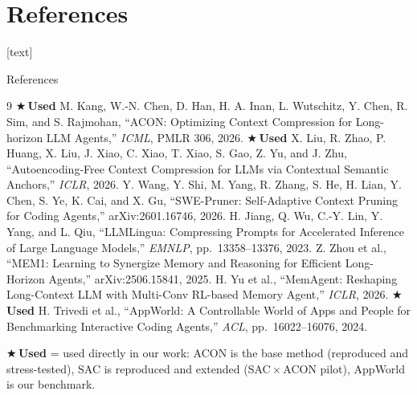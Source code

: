 \documentclass[aspectratio=169,10pt]{beamer}
\begin{document}
\section*{References}
[text]
\begin{frame}{References}
\scriptsize
\begin{thebibliography}{9}
 \textcolor{cmpgreen}{\textbf{$\bigstar$\,Used}} M. Kang, W.-N. Chen, D. Han, H. A. Inan, L. Wutschitz, Y. Chen,
R. Sim, and S. Rajmohan, ``ACON: Optimizing Context Compression for
Long-horizon LLM Agents,'' \emph{ICML}, PMLR 306, 2026.
 \textcolor{cmpgreen}{\textbf{$\bigstar$\,Used}} X. Liu, R. Zhao, P. Huang, X. Liu, J. Xiao, C. Xiao, T. Xiao,
S. Gao, Z. Yu, and J. Zhu, ``Autoencoding-Free Context Compression for LLMs via
Contextual Semantic Anchors,'' \emph{ICLR}, 2026.
 Y. Wang, Y. Shi, M. Yang, R. Zhang, S. He, H. Lian,
Y. Chen, S. Ye, K. Cai, and X. Gu, ``SWE-Pruner: Self-Adaptive Context Pruning
for Coding Agents,'' arXiv:2601.16746, 2026.
 H. Jiang, Q. Wu, C.-Y. Lin, Y. Yang, and L. Qiu,
``LLMLingua: Compressing Prompts for Accelerated Inference of Large Language
Models,'' \emph{EMNLP}, pp.~13358--13376, 2023.
 Z. Zhou et al., ``MEM1: Learning to Synergize Memory and
Reasoning for Efficient Long-Horizon Agents,'' arXiv:2506.15841, 2025.
 H. Yu et al., ``MemAgent: Reshaping Long-Context LLM with
Multi-Conv RL-based Memory Agent,'' \emph{ICLR}, 2026.
 \textcolor{cmpgreen}{\textbf{$\bigstar$\,Used}} H. Trivedi et al., ``AppWorld: A Controllable World of Apps
and People for Benchmarking Interactive Coding Agents,'' \emph{ACL},
pp.~16022--16076, 2024.
\end{thebibliography}
\vspace{0.1cm}
{\scriptsize\textcolor{cmpgreen}{$\bigstar$\,\textbf{Used}} = used directly in our work: ACON is the base method (reproduced and stress-tested), SAC is reproduced and extended (SAC\,$\times$\,ACON pilot), AppWorld is our benchmark.}
\end{frame}
\end{document}
